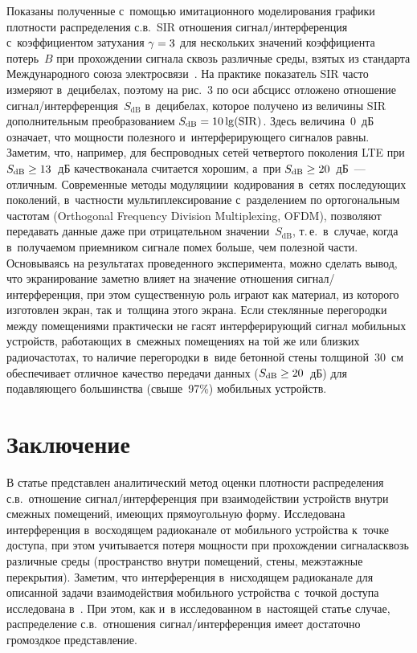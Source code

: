 \begin{multicols}{2}
  Показаны полученные с~помощью имитационного моделирования графики 
плотности распределения с.в.~SIR отношения сигнал/интерференция 
с~коэффициентом затухания $\gamma\hm=3$ для нескольких значений 
коэффициента потерь~$B$ при про\-хож\-де\-нии сигнала сквозь различные 
среды, взятых из стандарта Международного союза  
электросвязи~\cite{16-gai}. На практике показатель SIR часто измеряют 
в~децибелах, поэтому на рис.~3 по оси абсцисс отложено отношение  
сиг\-нал/ин\-тер\-фе\-рен\-ция~$S_{\mathrm{dB}}$ в~децибелах, которое получено 
из величины SIR дополнительным преобразованием $S_{\mathrm{dB}}\hm= 
10\lg(\mathrm{SIR})$. Здесь величина~0~дБ означает, что мощности полезного 
и~ин\-тер\-фе\-ри\-ру\-юще\-го сигналов равны. Заметим, что, например, для 
беспроводных сетей чет\-вер\-то\-го поколения LTE при $S_{\mathrm{dB}}\hm\geq 13$~дБ 
качество\linebreak канала считается хорошим, а~при $S_{\mathrm{dB}}\hm\geq 20$~дБ~--- 
отличным. Современные методы модуляции\linebreak и~кодирования в~сетях 
по\-сле\-ду\-ющих поколений, в~част\-ности мультиплексирование с~разделением 
по ортогональным час\-то\-там (Orthogonal Frequency Division Multiplexing, 
OFDM), позволяют передавать данные даже при отрицательном 
значении~$S_{\mathrm{dB}}$, т.\,е.\ в~случае, когда в~получаемом приемником сигнале 
помех больше, чем полезной час\-ти. Основываясь на результатах 
проведенного эксперимента, можно сделать вывод, что экранирование 
заметно влияет на значение отношения сиг\-нал/ин\-тер\-фе\-рен\-ция, при 
этом существенную роль играют как материал, из которого изготовлен экран, 
так и~толщина этого экрана. Если стеклянные перегородки между 
помещениями практически не гасят интерферирующий сигнал мобильных 
устройств, работающих в~смежных помещениях на той же или близких 
радиочастотах, то наличие перегородки в~виде бетонной стены толщиной~30~см 
обеспечивает отличное качество передачи данных ($S_{\mathrm{dB}}\hm\geq 
20$~дБ) для подавляющего большинства (свыше~97\%) мобильных 
устройств.

\vspace*{-6pt}
  
\section{Заключение}

  В статье представлен аналитический метод оценки плотности 
распределения с.в.\ отношение сиг\-нал/ин\-тер\-фе\-рен\-ция при 
взаимодействии устройств внутри смежных помещений, имеющих 
прямоугольную форму. Исследована интерференция в~восходящем 
радиоканале от мобильного устройства к~точке доступа, при этом 
учитывается потеря мощности при прохождении сигнала\linebreak сквозь различные 
среды (пространство внутри помеще\-ний, стены, межэтажные перекрытия). 
Заме\-тим, что интерференция в~нисходящем радиоканале для описанной 
задачи взаимодействия мобильного устройства с~точкой доступа исследована 
в~\cite{13-gai}. При этом, как и~в исследованном в~настоящей статье случае, 
распределение с.в.\ отношения сиг\-нал/ин\-тер\-фе\-рен\-ция имеет 
достаточно громоздкое представление.
  

\end{multicols}
